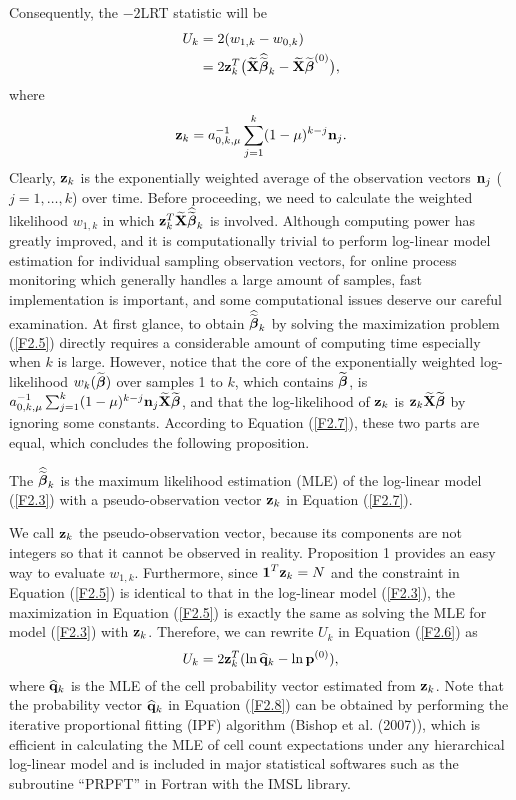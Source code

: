 Consequently, the $-2$LRT statistic will be
\begin{align}
U_k&=2(w_{1,k}-w_{0,k})\nonumber\\
&=2{\bf z}_k^T\big(\wt{\bf X}\widehat{\wt{\bm\beta}}_k-\wt{\bf
X}\wt{\bm\beta}^{(0)}\big), \label{F2.6}
\end{align}
where
\begin{equation}
{\bf z}_k=a_{0,k,\mu}^{-1}\sum_{j=1}^{k}(1-\mu)^{k-j}{\bf n}_j.\label{F2.7}
\end{equation}
Clearly, ${\bf z}_k$ is the exponentially weighted average of the observation
vectors ${\bf n}_j$ ($j=1,\ldots,k$) over time. Before proceeding, we need to
calculate the weighted likelihood $w_{1,k}$ in which ${\bf z}_k^T\widetilde{\bf
X}\widehat{\widetilde{\boldsymbol\beta}}_k$ is involved. Although computing power has greatly
improved, and it is computationally trivial to perform log-linear model estimation
for individual sampling observation vectors, for online process monitoring which
generally handles a large amount of samples, fast implementation is important, and
some computational issues deserve our careful examination. At first glance, to
obtain $\widehat{\widetilde{\boldsymbol\beta}}_k$ by solving the maximization problem (\ref{F2.5})
directly requires a considerable amount of computing time especially when $k$ is
large. However, notice that the core of the exponentially weighted log-likelihood
$w_k(\widetilde{\boldsymbol\beta})$ over samples 1 to $k$, which contains $\widetilde{\boldsymbol\beta}$, is
$a_{0,k,\mu}^{-1}\sum_{j=1}^{k}(1-\mu)^{k-j}{\bf n}_j\widetilde{\bf X}\widetilde{\boldsymbol\beta}$, and
that the log-likelihood of ${\bf z}_k$ is ${\bf z}_k\widetilde{\bf X}\widetilde{\boldsymbol\beta}$ by
ignoring some constants. According to Equation (\ref{F2.7}), these two parts are
equal, which concludes the following proposition.
\begin{pro}
The $\widehat{\widetilde{\boldsymbol\beta}}_k$ is the maximum likelihood estimation (MLE) of the
log-linear model (\ref{F2.3}) with a pseudo-observation vector ${\bf z}_k$ in
Equation (\ref{F2.7}).
\end{pro}
We call ${\bf z}_k$ the pseudo-observation vector, because its components are not
integers so that it cannot be observed in reality. Proposition 1 provides an easy
way to evaluate $w_{1,k}$. Furthermore, since $\boldsymbol 1^T{\bf z}_k=N$ and the
constraint in Equation (\ref{F2.5}) is identical to that in the log-linear model
(\ref{F2.3}), the maximization in Equation (\ref{F2.5}) is exactly the same as
solving the MLE for model (\ref{F2.3}) with ${\bf z}_k$. Therefore, we can rewrite
$U_k$ in Equation (\ref{F2.6}) as
\begin{equation}
U_k=2{\bf z}_k^T(\ln\widehat{\bf q}_k-\ln{\bf p}^{(0)}),\label{F2.8}
\end{equation}
where $\widehat{\bf q}_k$ is the MLE of the cell probability vector estimated from
${\bf z}_k$. Note that the probability vector $\widehat{\bf q}_k$ in Equation
(\ref{F2.8}) can be obtained by performing the iterative proportional fitting (IPF)
algorithm (Bishop et al. (2007)), which is efficient in calculating the MLE of cell
count expectations under any hierarchical log-linear model and is included in major
statistical softwares such as the subroutine ``PRPFT'' in Fortran with the IMSL
library.

